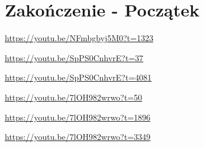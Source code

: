 \documentclass[12pt]{mwrep}
\begin{document}
	
	\section{Zakończenie - Początek}
	
	
	\begin{thebibliography}{1}
		\url{https://youtu.be/NFmbgbyj5M0?t=1323}
		
		\url{https://youtu.be/SpPS0CnhvrE?t=37}
		
		\url{https://youtu.be/SpPS0CnhvrE?t=4081}
		
		\url{https://youtu.be/7lOH982wrwo?t=50}
		
		\url{https://youtu.be/7lOH982wrwo?t=1896}
		
		\url{https://youtu.be/7lOH982wrwo?t=3349}

	\end{thebibliography}
	
\end{document}
